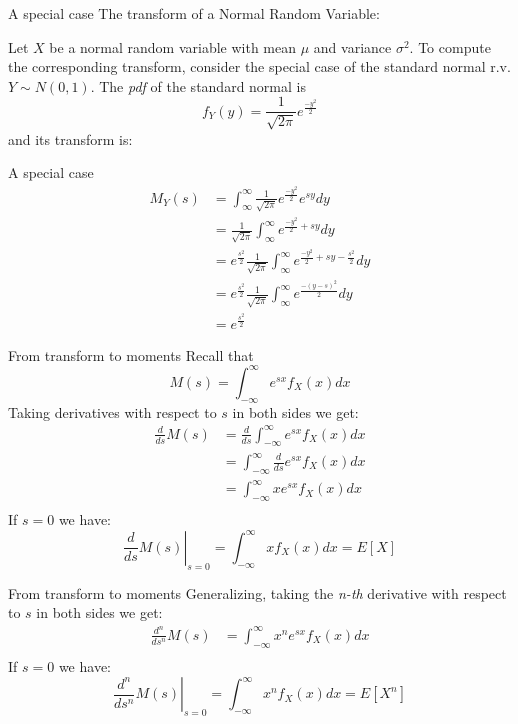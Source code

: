 \documentclass[aspectratio=169]{beamer}
\begin{document}
\begin{frame}{A special case}
        The transform of a Normal Random Variable:

        Let $X$ be a normal random variable with mean $\mu$ and variance $\sigma^2$. To compute the corresponding transform, consider the special case of the standard normal r.v. $Y\sim N(0,1)$.
        The \textit{pdf} of the standard normal is \[f_Y(y)=\frac{1}{\sqrt{2\pi}}e^{\frac{-y^2}{2}}\] and its transform is:
\end{frame}

\begin{frame}{A special case}
        \begin{align*}
            M_Y(s) &= \int_{\infty}^\infty \frac{1}{\sqrt{2\pi}} e^{\frac{-y^2}{2}}e^{sy}dy\\
                   &= \frac{1}{\sqrt{2\pi}} \int_{\infty}^\infty e^{\frac{-y^2}{2}+sy}dy\\
                   &= e^{\frac{s^2}{2}}\frac{1}{\sqrt{2\pi}} \int_{\infty}^\infty e^{\frac{-y^2}{2}+sy-\frac{s^2}{2}}dy\\
                   &= e^{\frac{s^2}{2}}\frac{1}{\sqrt{2\pi}} \int_{\infty}^\infty e^{\frac{-(y-s)^2}{2}}dy\\
                   &= e^{\frac{s^2}{2}}
        \end{align*}
\end{frame}

\begin{frame}{From transform to moments}
    Recall that \[M(s)=\int_{-\infty}^\infty e^{sx}f_X(x)dx\]
    Taking derivatives with respect to $s$ in both sides we get:
    \begin{align*}
        \frac{d}{ds}M(s) &= \frac{d}{ds}\int_{-\infty}^\infty e^{sx}f_X(x)dx\\
                         &= \int_{-\infty}^\infty \frac{d}{ds}e^{sx}f_X(x)dx\\
                         &= \int_{-\infty}^\infty xe^{sx}f_X(x)dx\\
    \end{align*}
    If $s=0$ we have:\[\left.\frac{d}{ds}M(s)\right|_{s=0}=\int_{-\infty}^\infty xf_X(x)dx=E[X]\]
\end{frame}

\begin{frame}{From transform to moments}
    Generalizing, taking the \emph{n-th} derivative with respect to $s$ in both sides we get:
    \begin{align*}
        \frac{d^n}{ds^n}M(s) &= \int_{-\infty}^\infty x^ne^{sx}f_X(x)dx\\
    \end{align*}
    If $s=0$ we have:\[\left.\frac{d^n}{ds^n}M(s)\right|_{s=0}=\int_{-\infty}^\infty x^nf_X(x)dx=E[X^n]\]
\end{frame}
\end{document}
